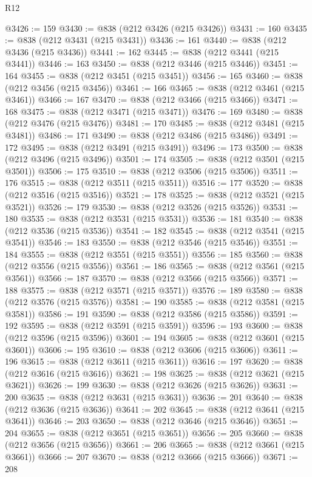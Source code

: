 \begin{lexlean}{R12}
\begin{coremodule}
@3426 := 159
@3430 := @838 (@212 @3426 (@215 @3426))
@3431 := 160
@3435 := @838 (@212 @3431 (@215 @3431))
@3436 := 161
@3440 := @838 (@212 @3436 (@215 @3436))
@3441 := 162
@3445 := @838 (@212 @3441 (@215 @3441))
@3446 := 163
@3450 := @838 (@212 @3446 (@215 @3446))
@3451 := 164
@3455 := @838 (@212 @3451 (@215 @3451))
@3456 := 165
@3460 := @838 (@212 @3456 (@215 @3456))
@3461 := 166
@3465 := @838 (@212 @3461 (@215 @3461))
@3466 := 167
@3470 := @838 (@212 @3466 (@215 @3466))
@3471 := 168
@3475 := @838 (@212 @3471 (@215 @3471))
@3476 := 169
@3480 := @838 (@212 @3476 (@215 @3476))
@3481 := 170
@3485 := @838 (@212 @3481 (@215 @3481))
@3486 := 171
@3490 := @838 (@212 @3486 (@215 @3486))
@3491 := 172
@3495 := @838 (@212 @3491 (@215 @3491))
@3496 := 173
@3500 := @838 (@212 @3496 (@215 @3496))
@3501 := 174
@3505 := @838 (@212 @3501 (@215 @3501))
@3506 := 175
@3510 := @838 (@212 @3506 (@215 @3506))
@3511 := 176
@3515 := @838 (@212 @3511 (@215 @3511))
@3516 := 177
@3520 := @838 (@212 @3516 (@215 @3516))
@3521 := 178
@3525 := @838 (@212 @3521 (@215 @3521))
@3526 := 179
@3530 := @838 (@212 @3526 (@215 @3526))
@3531 := 180
@3535 := @838 (@212 @3531 (@215 @3531))
@3536 := 181
@3540 := @838 (@212 @3536 (@215 @3536))
@3541 := 182
@3545 := @838 (@212 @3541 (@215 @3541))
@3546 := 183
@3550 := @838 (@212 @3546 (@215 @3546))
@3551 := 184
@3555 := @838 (@212 @3551 (@215 @3551))
@3556 := 185
@3560 := @838 (@212 @3556 (@215 @3556))
@3561 := 186
@3565 := @838 (@212 @3561 (@215 @3561))
@3566 := 187
@3570 := @838 (@212 @3566 (@215 @3566))
@3571 := 188
@3575 := @838 (@212 @3571 (@215 @3571))
@3576 := 189
@3580 := @838 (@212 @3576 (@215 @3576))
@3581 := 190
@3585 := @838 (@212 @3581 (@215 @3581))
@3586 := 191
@3590 := @838 (@212 @3586 (@215 @3586))
@3591 := 192
@3595 := @838 (@212 @3591 (@215 @3591))
@3596 := 193
@3600 := @838 (@212 @3596 (@215 @3596))
@3601 := 194
@3605 := @838 (@212 @3601 (@215 @3601))
@3606 := 195
@3610 := @838 (@212 @3606 (@215 @3606))
@3611 := 196
@3615 := @838 (@212 @3611 (@215 @3611))
@3616 := 197
@3620 := @838 (@212 @3616 (@215 @3616))
@3621 := 198
@3625 := @838 (@212 @3621 (@215 @3621))
@3626 := 199
@3630 := @838 (@212 @3626 (@215 @3626))
@3631 := 200
@3635 := @838 (@212 @3631 (@215 @3631))
@3636 := 201
@3640 := @838 (@212 @3636 (@215 @3636))
@3641 := 202
@3645 := @838 (@212 @3641 (@215 @3641))
@3646 := 203
@3650 := @838 (@212 @3646 (@215 @3646))
@3651 := 204
@3655 := @838 (@212 @3651 (@215 @3651))
@3656 := 205
@3660 := @838 (@212 @3656 (@215 @3656))
@3661 := 206
@3665 := @838 (@212 @3661 (@215 @3661))
@3666 := 207
@3670 := @838 (@212 @3666 (@215 @3666))
@3671 := 208

\end{coremodule}
\end{lexlean}
